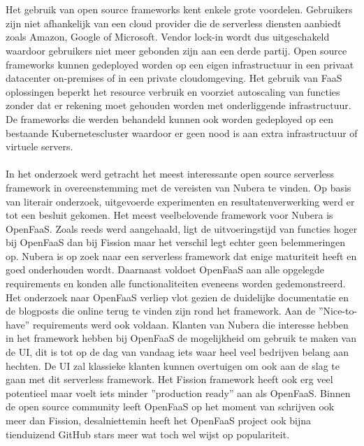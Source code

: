 \\\\
Het gebruik van open source frameworks kent enkele grote voordelen. Gebruikers zijn niet afhankelijk van een cloud provider die de serverless diensten aanbiedt zoals Amazon, Google of Microsoft. Vendor lock-in wordt dus uitgeschakeld waardoor gebruikers niet meer gebonden zijn aan een derde partij. Open source frameworks kunnen gedeployed worden op een eigen infrastructuur in een privaat datacenter on-premises of in een private cloudomgeving. Het gebruik van FaaS oplossingen beperkt het resource verbruik en voorziet autoscaling van functies zonder dat er rekening moet gehouden worden met onderliggende infrastructuur. De frameworks die werden behandeld kunnen ook worden gedeployed op een bestaande Kubernetescluster waardoor er geen nood is aan extra infrastructuur of virtuele servers.
\\\\
In het onderzoek werd getracht het meest interessante open source serverless framework in overeenstemming met de vereisten van Nubera te vinden. Op basis van literair onderzoek, uitgevoerde experimenten en resultatenverwerking werd er tot een besluit gekomen. Het meest veelbelovende framework voor Nubera is OpenFaaS. Zoals reeds werd aangehaald, ligt de uitvoeringstijd van functies hoger bij OpenFaaS dan bij Fission maar het verschil legt echter geen belemmeringen op. Nubera is op zoek naar een serverless framework dat enige maturiteit heeft en goed onderhouden wordt. Daarnaast voldoet OpenFaaS aan alle opgelegde requirements en konden alle functionaliteiten eveneens worden gedemonstreerd. Het onderzoek naar OpenFaaS verliep vlot gezien de duidelijke documentatie en de blogposts die online terug te vinden zijn rond het framework. Aan de ''Nice-to-have'' requirements werd ook voldaan. Klanten van Nubera die interesse hebben in het framework hebben bij OpenFaaS de mogelijkheid om gebruik te maken van de UI, dit is tot op de dag van vandaag iets waar heel veel bedrijven belang aan hechten. De UI zal klassieke klanten kunnen overtuigen om ook aan de slag te gaan met dit serverless framework. Het Fission framework heeft ook erg veel potentieel maar voelt iets minder ''production ready'' aan als OpenFaaS. Binnen de open source community leeft OpenFaaS op het moment van schrijven ook meer dan Fission, desalniettemin heeft het OpenFaaS project ook bijna tienduizend GitHub stars meer wat toch wel wijst op populariteit.
\\\\
